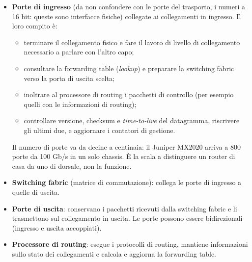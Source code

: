 \begin{itemize}
    \item \textbf{Porte di ingresso} (da non confondere con le porte del trasporto, i numeri a 16 bit: queste sono
          interfacce fisiche) collegate ai collegamenti in ingresso. Il loro compito è:
    \begin{itemize}
      \item terminare il collegamento fisico e fare il lavoro di livello di collegamento necessario a parlare con l'altro
            capo;
      \item consultare la forwarding table (\emph{lookup}) e preparare la switching fabric verso la porta di uscita scelta;
      \item inoltrare al processore di routing i pacchetti di controllo (per esempio quelli con le informazioni di routing);
      \item controllare versione, checksum e \emph{time-to-live} del datagramma, riscrivere gli ultimi due, e aggiornare i
            contatori di gestione.
    \end{itemize}
    Il numero di porte va da decine a centinaia: il Juniper MX2020 arriva a 800 porte da 100 Gb/s in un solo chassis.
    È la scala a distinguere un router di casa da uno di dorsale, non la funzione.
    \item \textbf{Switching fabric} (matrice di commutazione): collega le porte di ingresso a quelle di uscita.
    \item \textbf{Porte di uscita}: conservano i pacchetti ricevuti dalla switching fabric e li trasmettono sul
          collegamento in uscita. Le porte possono essere bidirezionali (ingresso e uscita accoppiati).
    \item \textbf{Processore di routing}: esegue i protocolli di routing, mantiene informazioni sullo stato dei
          collegamenti e calcola e aggiorna la forwarding table.
\end{itemize}


